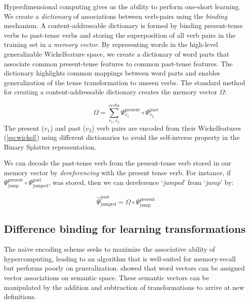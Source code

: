\documentclass{article}
\begin{document}
Hyperdimensional computing gives us the ability to perform one-short learning. We create a \emph{dictionary} of associations between verb-pairs using the \emph{binding} mechanism. A content-addressable dictionary is formed by binding present-tense verbs to past-tense verbs and storing the superposition of all verb pairs in the training set in a \emph{memory vector}. By representing words in the high-level generalizable Wickelfeature space, we create a dictionary of word parts that associate common present-tense features to common past-tense features. The dictionary highlights common mappings between word parts and enables generalization of the tense transformation to unseen verbs. The standard method for creating a content-addressable dictionary creates the memory vector $\Omega$:

\begin{equation}
\Omega = \sum_{v_1, v_2}^{verbs} \Psi^{\text{present}}_{v_1} \circ \Psi^{\text{past}}_{v_2}
\end{equation}
The present ($v_1$) and past ($v_2$) verb pairs are encoded from their Wickelfeatures (\ref{eq:wickel}) using different dictionaries to avoid the self-inverse property in the Binary Splatter representation. 

We can decode the past-tense verb from the present-tense verb stored in our memory vector by \emph{dereferencing} with the present tense verb. For instance, if $\Psi_{\text{jump}}^{\text{present}} \circ \Psi_{\text{jumped}}^{\text{past}}$, was stored, then we can dereference `\emph{jumped}' from `\emph{jump}' by:

\begin{equation}
\hat{\Psi}_{\text{jumped}}^{\text{past}} = \Omega \circ \Psi_{\text{jump}}^{\text{present}}
\end{equation}

\subsection{Difference binding for learning transformations}
The naive encoding scheme seeks to maximize the associative ability of hypercomputing, leading to an algorithm that is well-suited for memory-recall but performs poorly on generalization. \citet{Mikolov2013} showed that word vectors can be assigned vector associations on semantic space. These semantic vectors can be manipulated by the addition and subtraction of transformations to arrive at new definitions.
\end{document}
